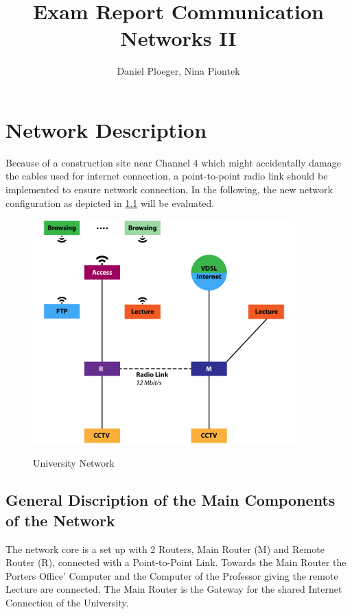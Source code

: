 \documentclass[a4paper,10pt]{book}
\title{Exam Report Communication Networks II}
\author{Daniel Ploeger, Nina Piontek}
\begin{document}
\maketitle
\tableofcontents



\chapter{Network Description}
Because of a construction site near Channel 4 which might accidentally damage the cables 
used for internet connection,
a point-to-point radio link should be implemented to ensure network connection.
In the following, the new network configuration as depicted in \ref{fig:network} will be evaluated.
\begin{figure}[!ht]
  \centering
    \includegraphics[width=0.9\textwidth]{graphics-03.png}
    \label{fig:network}
    \caption{University Network}
\end{figure}

\section{General Discription of the Main Components of the Network}
The network core is a set up with 2 Routers, Main Router (M) and Remote Router (R), connected with a Point-to-Point Link. 
Towards the Main Router the Porters Office' Computer and the Computer of the Professor giving the remote Lecture are connected.
The Main Router is the Gateway for the shared Internet Connection of the University.
\end{document}
